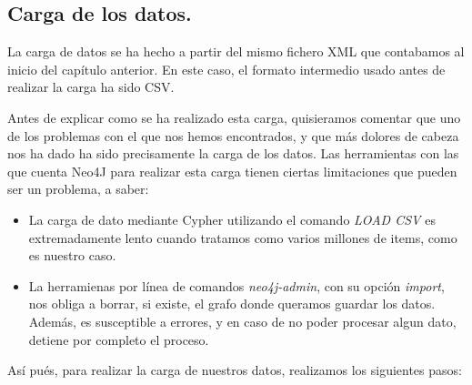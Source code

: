 \subsection{Carga de los datos.}

La carga de datos se ha hecho a partir del mismo fichero \gls{XML} que contabamos al inicio del capítulo anterior. En este caso, el formato intermedio usado antes de realizar la carga ha sido \gls{CSV}. 

Antes de explicar como se ha realizado esta carga, quisieramos comentar que uno de los problemas con el que nos hemos encontrados, y que más dolores de cabeza nos ha dado ha sido precisamente la carga de los datos. Las herramientas con las que cuenta Neo4J para realizar esta carga tienen ciertas limitaciones que pueden ser un problema, a saber:

\begin{itemize}
 \item La carga de dato mediante Cypher utilizando el comando \textit{LOAD CSV} es extremadamente lento cuando tratamos como varios millones de items, como es nuestro caso.
 \item La herramienas por línea de comandos \textit{neo4j-admin}, con su opción \textit{import}, nos obliga a borrar, si existe, el grafo donde queramos guardar los datos. Además, es susceptible a errores, y en caso de no poder procesar algun dato, detiene por completo el proceso.
\end{itemize}

Así pués, para realizar la carga de nuestros datos, realizamos los siguientes pasos:

